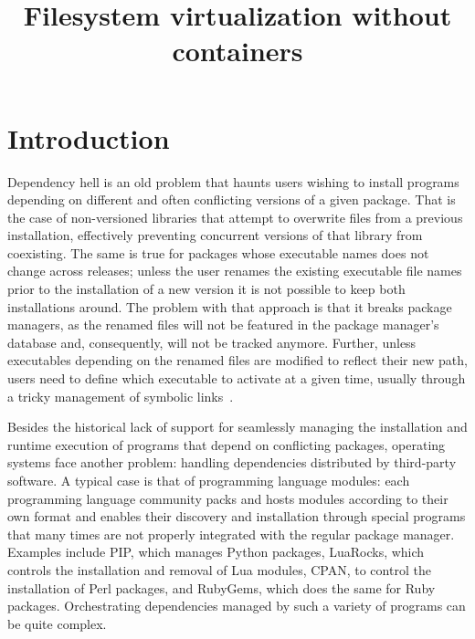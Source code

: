 \title{Filesystem virtualization without containers}


\section{Introduction}
Dependency hell is an old problem that haunts users wishing to install programs depending on
different and often conflicting versions of a given package. That is the case of non-versioned
libraries that attempt to overwrite files from a previous installation, effectively preventing
concurrent versions of that library from coexisting. The same is true for packages whose executable
names does not change across releases; unless the user renames the existing executable file names
prior to the installation of a new version it is not possible to keep both installations around.
The problem with that approach is that it breaks package managers, as the renamed files will not
be featured in the package manager's database and, consequently, will not be tracked anymore. Further, 
unless executables depending on the renamed files are modified to reflect their new path, users need
to define which executable to activate at a given time, usually through a tricky management of
symbolic links~\cite{RHEL?}.

Besides the historical lack of support for seamlessly managing the installation and runtime
execution of programs that depend on conflicting packages, operating systems face another problem:
handling dependencies distributed by third-party software. A typical case is that of programming
language modules: each programming language community packs and hosts modules according to their own
format and enables their discovery and installation through special programs that many times are not
properly integrated with the regular package manager. Examples include PIP, which manages Python
packages, LuaRocks, which controls the installation and removal of Lua modules, CPAN, to control the
installation of Perl packages, and RubyGems, which does the same for Ruby packages. Orchestrating
dependencies managed by such a variety of programs can be quite complex.

